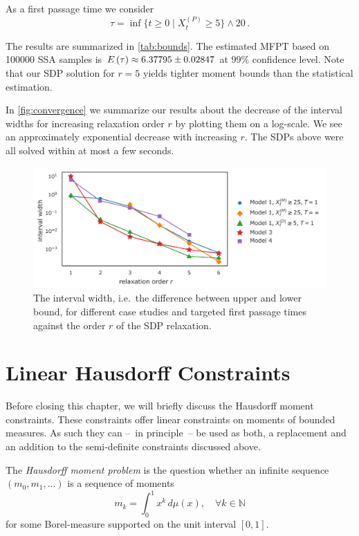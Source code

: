 As a first passage time we consider 
\[
	\tau=\inf\{t\geq 0\mid X_t^{(P)} \geq 5\}\land 20\,.
\]


The results are summarized in \autoref{tab:bounds}.
The estimated \ac{MFPT} based on \num{100000}
\ac{SSA} samples is ${E}\left(\tau\right)\approx 6.37795\pm0.02847$ at $99\%$ confidence level.
Note that our \ac{SDP} solution for $r=5$ yields tighter moment bounds than
the statistical estimation.%


In \autoref{fig:convergence} we summarize our results about the decrease of the interval widths for increasing relaxation order $r$ by plotting them on a log-scale.
We see an approximately exponential decrease with increasing $r$.
The \acp{SDP} above were all solved within at most a few seconds.
\begin{figure}[t]
    \centering
    \includegraphics[width=\textwidth]{gfx/convergence.pdf}
	\caption[\ac{MFPT} bound convergence]{The interval width, i.e.\ the difference between upper and lower bound,
    for different case studies and targeted first passage times against the order $r$
    of the \ac{SDP} relaxation.\label{fig:convergence}}
\end{figure}



\section{Linear Hausdorff Constraints}\label{sec:hausdorff}
Before closing this chapter, we will briefly discuss the Hausdorff moment constraints.
These constraints offer linear constraints on moments of bounded measures.
As such they can --~in principle~-- be used as both, a replacement and an addition to the semi-definite constraints discussed above.

The \emph{Hausdorff moment problem} is the question whether an infinite sequence $(m_0, m_1, \dotsc)$ is a sequence of moments
\[
	m_k = \int_{0}^{1} x^k\,d\mu(x), \quad \forall k\in\mathbb{N}
\]
for some Borel-measure supported on the unit interval $[0,1]$.

